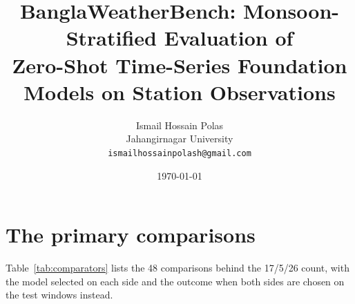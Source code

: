 \documentclass[11pt,a4paper]{article}
\title{BanglaWeatherBench: Monsoon-Stratified Evaluation of\\
Zero-Shot Time-Series Foundation Models on Station Observations}
\author{Ismail Hossain Polas\\
Jahangirnagar University\\
\texttt{ismailhossainpolash@gmail.com}}
\date{\today}
\begin{document}
\maketitle

\begin{abstract}

\end{abstract}














\appendix
\section{The primary comparisons}
\label{app:comparators}

Table~\ref{tab:comparators} lists the 48 comparisons behind the 17/5/26 count, with the model selected on each side and
the outcome when both sides are chosen on the test windows instead.


\end{document}
